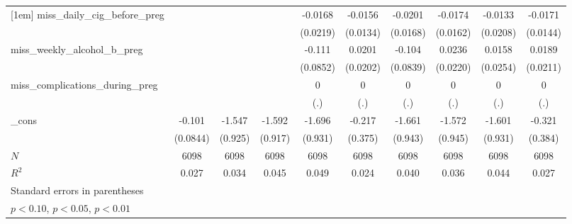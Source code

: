 \begin{table}[htbp]
\begin{tabular}{l*{9}{c}}
[1em]
miss\_daily\_cig\_before\_preg&                     &                     &                     &     -0.0168         &     -0.0156         &     -0.0201         &     -0.0174         &     -0.0133         &     -0.0171         \\
            &                     &                     &                     &    (0.0219)         &    (0.0134)         &    (0.0168)         &    (0.0162)         &    (0.0208)         &    (0.0144)         \\
[1em]
miss\_weekly\_alcohol\_b\_preg&                     &                     &                     &      -0.111         &      0.0201         &      -0.104         &      0.0236         &      0.0158         &      0.0189         \\
            &                     &                     &                     &    (0.0852)         &    (0.0202)         &    (0.0839)         &    (0.0220)         &    (0.0254)         &    (0.0211)         \\
[1em]
miss\_complications\_during\_preg&                     &                     &                     &           0         &           0         &           0         &           0         &           0         &           0         \\
            &                     &                     &                     &         (.)         &         (.)         &         (.)         &         (.)         &         (.)         &         (.)         \\
[1em]
\_cons      &      -0.101         &      -1.547\sym{*}  &      -1.592\sym{*}  &      -1.696\sym{*}  &      -0.217         &      -1.661\sym{*}  &      -1.572\sym{*}  &      -1.601\sym{*}  &      -0.321         \\
            &    (0.0844)         &     (0.925)         &     (0.917)         &     (0.931)         &     (0.375)         &     (0.943)         &     (0.945)         &     (0.931)         &     (0.384)         \\
\hline
\(N\)       &        6098         &        6098         &        6098         &        6098         &        6098         &        6098         &        6098         &        6098         &        6098         \\
\(R^{2}\)   &       0.027         &       0.034         &       0.045         &       0.049         &       0.024         &       0.040         &       0.036         &       0.044         &       0.027         \\
\hline\hline
\multicolumn{10}{l}{\footnotesize Standard errors in parentheses}\\
\multicolumn{10}{l}{\footnotesize \sym{*} \(p<0.10\), \sym{**} \(p<0.05\), \sym{***} \(p<0.01\)}\\
\end{tabular}
\end{table}
